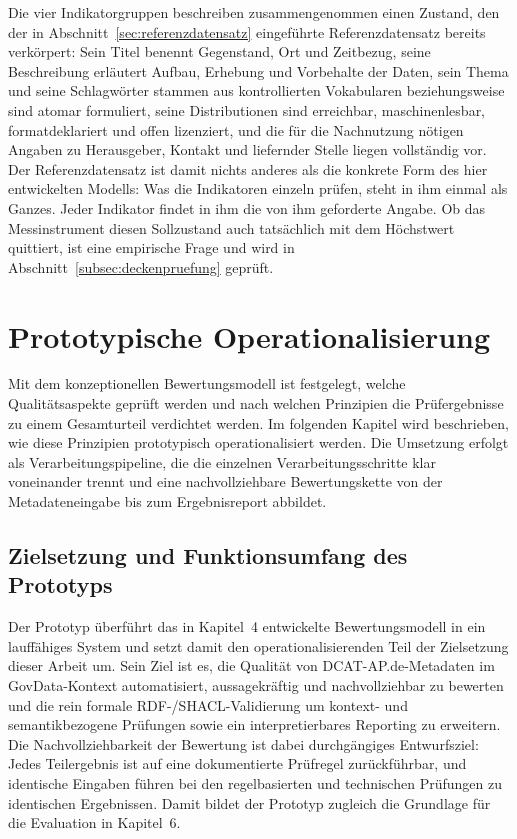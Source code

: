 Die vier Indikatorgruppen beschreiben zusammengenommen einen Zustand, den der in Abschnitt~\ref{sec:referenzdatensatz} eingeführte Referenzdatensatz bereits verkörpert: Sein Titel benennt Gegenstand, Ort und Zeitbezug, seine Beschreibung erläutert Aufbau, Erhebung und Vorbehalte der Daten, sein Thema und seine Schlagwörter stammen aus kontrollierten Vokabularen beziehungsweise sind atomar formuliert, seine Distributionen sind erreichbar, maschinenlesbar, formatdeklariert und offen lizenziert, und die für die Nachnutzung nötigen Angaben zu Herausgeber, Kontakt und liefernder Stelle liegen vollständig vor. Der Referenzdatensatz ist damit nichts anderes als die konkrete Form des hier entwickelten Modells: Was die Indikatoren einzeln prüfen, steht in ihm einmal als Ganzes. Jeder Indikator findet in ihm die von ihm geforderte Angabe. Ob das Messinstrument diesen Sollzustand auch tatsächlich mit dem Höchstwert quittiert, ist eine empirische Frage und wird in Abschnitt~\ref{subsec:deckenpruefung} geprüft.

\chapter{Prototypische Operationalisierung}
\label{sec:chapter_05}

Mit dem konzeptionellen Bewertungsmodell ist festgelegt, welche Qualitätsaspekte geprüft werden und nach welchen Prinzipien die Prüfergebnisse zu einem Gesamturteil verdichtet werden. Im folgenden Kapitel wird beschrieben, wie diese Prinzipien prototypisch operationalisiert werden.
Die Umsetzung erfolgt als Verarbeitungspipeline, die die einzelnen Verarbeitungsschritte klar voneinander trennt und eine nachvollziehbare Bewertungskette von der Metadateneingabe bis zum Ergebnisreport abbildet.

\section{Zielsetzung und Funktionsumfang des Prototyps}

Der Prototyp überführt das in Kapitel~4 entwickelte Bewertungsmodell in ein lauffähiges System und setzt damit den operationalisierenden Teil der Zielsetzung dieser Arbeit um. Sein Ziel ist es, die Qualität von DCAT-AP.de-Metadaten im GovData-Kontext automatisiert, aussagekräftig und nachvollziehbar zu bewerten und die rein formale RDF-/SHACL-Validierung um kontext- und semantikbezogene Prüfungen sowie ein interpretierbares Reporting zu erweitern. Die Nachvollziehbarkeit der Bewertung ist dabei durchgängiges Entwurfsziel: Jedes Teilergebnis ist auf eine dokumentierte Prüfregel zurückführbar, und identische Eingaben führen bei den regelbasierten und technischen Prüfungen zu identischen Ergebnissen. Damit bildet der Prototyp zugleich die Grundlage für die Evaluation in Kapitel~6.

